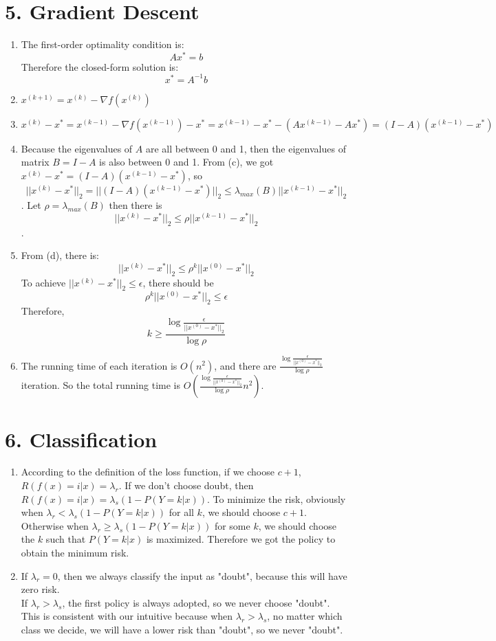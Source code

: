 \documentclass[11pt]{article}
\newenvironment{qparts}{\begin{enumerate}[{(}a{)}]}{\end{enumerate}}
\begin{document}
\section*{5. Gradient Descent}
\begin{qparts}
\item The first-order optimality condition is:
$$Ax^* = b$$
Therefore the closed-form solution is:
$$x^* = A^{-1}b$$

\item $x^{(k+1)} = x^{(k)} - \nabla f(x^{(k)})$

\item $x^{(k)}-x^* = x^{(k-1)} - \nabla f(x^{(k-1)}) - x^* = x^{(k-1)} - x^* - (Ax^{(k-1)} - Ax^*) = (I-A)(x^{(k-1)} - x^*)$

\item Because the eigenvalues of $A$ are all between 0 and 1, then the eigenvalues of matrix $B=I-A$ is also between 0 and 1. From (c), we got $x^{(k)}-x^* = (I-A)(x^{(k-1)} - x^*)$, so
$$||x^{(k)}-x^*||_2 = ||(I-A)(x^{(k-1)} - x^*)||_2 \leq \lambda_{max}(B)||x^{(k-1)} - x^*||_2$$. Let $\rho=\lambda_{max}(B)$ then there is $$||x^{(k)}-x^*||_2  \leq \rho ||x^{(k-1)} - x^*||_2$$.

\item From (d), there is:
$$||x^{(k)} - x^*||_2 \leq \rho^k ||x^{(0)} - x^*||_2$$
To achieve $||x^{(k)} - x^*||_2 \leq \epsilon$, there should be 
$$\rho^k ||x^{(0)} - x^*||_2 \leq \epsilon$$
Therefore,
$$k \geq \frac{\log \frac{\epsilon}{||x^{(0)} - x^*||_2}}{\log \rho}$$

\item The running time of each iteration is $O(n^2)$, and there are $\frac{\log \frac{\epsilon}{||x^{(0)} - x^*||_2}}{\log \rho}$ iteration. So the total running time is $O(\frac{\log \frac{\epsilon}{||x^{(0)} - x^*||_2}}{\log \rho} n^2)$.

\end{qparts}


\newpage
\section*{6. Classification}
\begin{qparts}
\item
According to the definition of the loss function, if we choose $c+1$, $R(f(x)=i|x) = \lambda_r$. If we don't choose doubt, then $R(f(x)=i|x) = \lambda_s(1-P(Y=k|x))$. To minimize the risk, obviously when $\lambda_r< \lambda_s(1-P(Y=k|x))$ for all $k$, we should choose $c+1$. Otherwise when $\lambda_r \geq \lambda_s(1-P(Y=k|x))$ for some $k$, we should choose the $k$ such that $P(Y=k|x)$ is maximized. Therefore we got the policy to obtain the minimum risk.

\item If $\lambda_r=0$, then we always classify the input as "doubt", because this will have zero risk.\\
If $\lambda_r > \lambda_s$, the first policy is always adopted, so we never choose "doubt". This is consistent with our intuitive because when $\lambda_r > \lambda_s$, no matter which class we decide, we will have a lower risk than "doubt", so we never "doubt".


\end{qparts}
\end{document}
